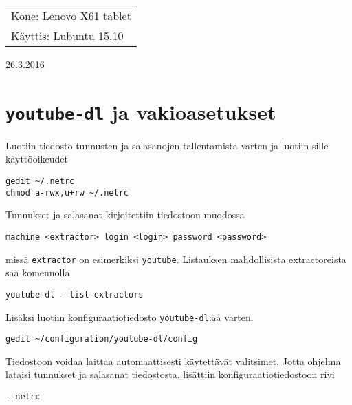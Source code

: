 \documentclass[main.tex]{subfiles}
\begin{document}
\thispagestyle{empty}
\begin{tabular}[t]{l}
Kone: Lenovo X61 tablet\\
Käyttis: Lubuntu 15.10
\end{tabular}
\hfill 26.3.2016

{\section{\texttt{youtube-dl} ja vakioasetukset}}

Luotiin tiedosto tunnusten ja salasanojen tallentamista varten ja luotiin sille käyttöoikeudet

\begin{lstlisting}
gedit ~/.netrc
chmod a-rwx,u+rw ~/.netrc
\end{lstlisting}

Tunnukset ja salasanat kirjoitettiin tiedostoon muodossa

\begin{lstlisting}
machine <extractor> login <login> password <password>
\end{lstlisting}

missä \texttt{extractor} on esimerkiksi \texttt{youtube}. Listauksen mahdollisista extractoreista saa komennolla

\begin{lstlisting}
youtube-dl --list-extractors
\end{lstlisting}

Lisäksi luotiin konfiguraatiotiedosto \texttt{youtube-dl}:ää varten.

\begin{lstlisting}
gedit ~/configuration/youtube-dl/config
\end{lstlisting}

Tiedostoon voidaa laittaa automaattisesti käytettävät valitsimet. Jotta ohjelma lataisi tunnukset ja salasanat tiedostosta, lisättiin konfiguraatiotiedostoon rivi

\begin{lstlisting}
--netrc
\end{lstlisting}
\end{document}
